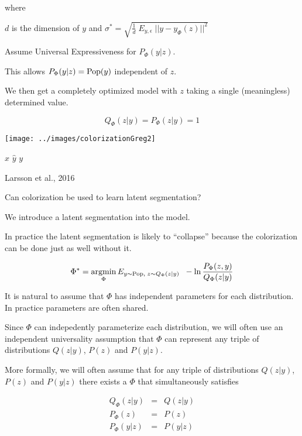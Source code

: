 {\vfill
where

\centerline{$d$ is the dimension of $y$ and $\sigma^*  =  \sqrt{\frac{1}{d}\;E_{y,\epsilon}\; ||y - y_\Phi(z)||^2}$}


Assume Universal Expressiveness for $P_\Phi(y|z)$.

\vfill
This allows $P_\Phi(y|z) = \mathrm{Pop}(y)$ independent of $z$.

\vfill
We then get a completely optimized model with $z$ taking a single (meaningless) determined value.

\vfill
$$Q_\Phi(z|y) = P_\Phi(z|y) = 1$$

\medskip
\centerline{\texttt{[image: ../images/colorizationGreg2]}}
\centerline{$x$ \hspace{4em} $\hat{y}$ \hspace{4em} $y$}
\centerline{\huge Larsson et al., 2016}

\vfill
Can colorization be used to learn latent segmentation?

\vfill
We introduce a latent segmentation into the model.

\vfill
In practice the latent segmentation is likely to ``collapse'' because the colorization can be done just as well without it.



$$\Phi^* = \operatorname*{argmin}_\Phi E_{y\sim \mathrm{Pop},\;z \sim Q_\Phi(z|y)}\;\;-\ln \frac{P_\Phi(z,y)}{Q_\Phi(z|y)}$$

\vfill
It is natural to assume  that $\Phi$ has independent parameters for each distribution.  In practice parameters are often shared.

\vfill
Since $\Phi$ can indepedently parameterize each distribution, we will often use an independent universality assumption
that $\Phi$ can represent any triple of distributions $Q(z|y)$, $P(z)$ and $P(y|z)$.



More formally, we will often assume that for any triple of distributions $Q(z|y)$, $P(z)$ and $P(y|z)$ there exists a $\Phi$ that {\color{red} simultaneously} satisfies

\begin{eqnarray*}
Q_\Phi(z|y) & = & Q(z|y) \\
P_\Phi(z) & = & P(z) \\
P_\Phi(y|z) & = & P(y|z)
\end{eqnarray*}

}

